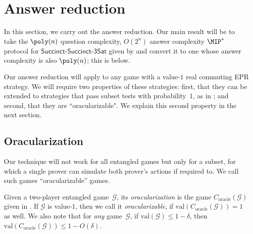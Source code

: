 \documentclass[11pt]{article}
\newcommand{\succinctsquared}{\mathsf{Succinct}\text{-}\mathsf{Succinct}\text{-}\mathsf{3Sat}}
\newcommand{\game}{\mathscr{G}}
\newcommand{\val}[1]{\mathrm{val}(#1)}
\begin{document}


\section{Answer reduction}\label{sec:answer-reduction}

In this section, we carry out the answer reduction.
Our main result will be to take the $\poly(n)$ question complexity, $O(2^n)$ answer complexity $\MIP^*$ protocol for $\succinctsquared$
given by 
and convert it to one whose answer complexity is also $\poly(n)$;
this is  below.

Our answer reduction will apply to any game with a value-$1$ real commuting EPR strategy.
We will require two properties of these strategies:
first, that they can be extended to strategies that pass subset tests with probability~$1$, as in ;
and second, that they are ``oracularizable".
We explain this second property in the next section. 

\subsection{Oracularization}

Our technique will not work for all entangled games but only for a
subset, for which a single prover can simulate both prover's actions
if required to. We call such games ``oracularizable'' games.


\begin{definition}
Given a two-player entangled game~$\game$,
its \emph{oracularization} is the game $C_{\mathrm{oracle}}(\game)$ given in .
If $\game$ is value-$1$,
then we call it \emph{oracularizable}, if $\val{C_{\mathrm{oracle}}(\game)} = 1$ as well. 
We also note that for \emph{any} game~$\game$, if $\val{\game} \leq 1 -
  \delta$, then $\val{C_{\mathrm{oracle}}(\game)} \leq 1 - O(\delta)$.
\end{definition}
\end{document}
